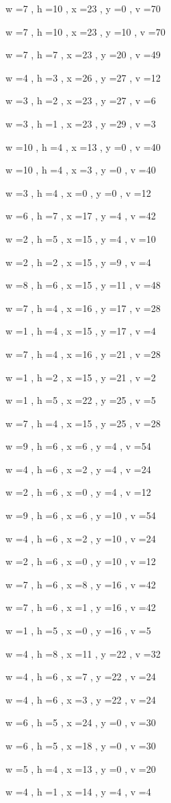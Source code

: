 \documentclass[11pt]{article}
\begin{document}
w =7 , h =10 , x =23 , y =0 , v =70
\par
w =7 , h =10 , x =23 , y =10 , v =70
\par
w =7 , h =7 , x =23 , y =20 , v =49
\par
w =4 , h =3 , x =26 , y =27 , v =12
\par
w =3 , h =2 , x =23 , y =27 , v =6
\par
w =3 , h =1 , x =23 , y =29 , v =3
\par
w =10 , h =4 , x =13 , y =0 , v =40
\par
w =10 , h =4 , x =3 , y =0 , v =40
\par
w =3 , h =4 , x =0 , y =0 , v =12
\par
w =6 , h =7 , x =17 , y =4 , v =42
\par
w =2 , h =5 , x =15 , y =4 , v =10
\par
w =2 , h =2 , x =15 , y =9 , v =4
\par
w =8 , h =6 , x =15 , y =11 , v =48
\par
w =7 , h =4 , x =16 , y =17 , v =28
\par
w =1 , h =4 , x =15 , y =17 , v =4
\par
w =7 , h =4 , x =16 , y =21 , v =28
\par
w =1 , h =2 , x =15 , y =21 , v =2
\par
w =1 , h =5 , x =22 , y =25 , v =5
\par
w =7 , h =4 , x =15 , y =25 , v =28
\par
w =9 , h =6 , x =6 , y =4 , v =54
\par
w =4 , h =6 , x =2 , y =4 , v =24
\par
w =2 , h =6 , x =0 , y =4 , v =12
\par
w =9 , h =6 , x =6 , y =10 , v =54
\par
w =4 , h =6 , x =2 , y =10 , v =24
\par
w =2 , h =6 , x =0 , y =10 , v =12
\par
w =7 , h =6 , x =8 , y =16 , v =42
\par
w =7 , h =6 , x =1 , y =16 , v =42
\par
w =1 , h =5 , x =0 , y =16 , v =5
\par
w =4 , h =8 , x =11 , y =22 , v =32
\par
w =4 , h =6 , x =7 , y =22 , v =24
\par
w =4 , h =6 , x =3 , y =22 , v =24
\par
\newpage




w =6 , h =5 , x =24 , y =0 , v =30
\par
w =6 , h =5 , x =18 , y =0 , v =30
\par
w =5 , h =4 , x =13 , y =0 , v =20
\par
w =4 , h =1 , x =14 , y =4 , v =4
\par
\newpage
\end{document}
